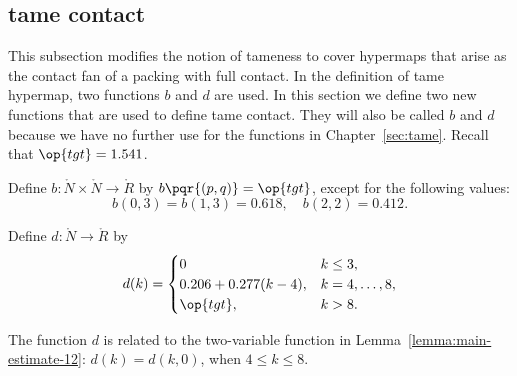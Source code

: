 \subsection{tame contact}

This subsection modifies the notion of tameness to cover hypermaps
that arise as the contact fan of a packing with full contact.  In the
definition of tame hypermap, two functions $b$ and $d$ are used.  In
this section we define two new functions that are used to define tame
contact.  They will also be called $b$ and $d$ because we have no
further use for the functions in Chapter~\ref{sec:tame}.  
Recall that $\op{tgt}=1.541$.
%
%

\begin{definition}[b]
  Define $b:\ring{N}\times \ring{N}\to \ring{R}$ by
  $b\pqr{(p,q)}=\op{tgt}$, except for the following values:
\begin{displaymath}
b(0,3)=b(1,3)=0.618,\quad b(2,2)=0.412.
\end{displaymath}
\end{definition}
%

\begin{definition}[d]
Define $d:\ring{N}\to \ring{R}$ by
\begin{displaymath}d(k) = \begin{cases}
0 & k\le 3, \\
0.206 + 0.277 (k-4),& k=4,\ldots,8,\\
\op{tgt},& k>8.\\
\end{cases}
\end{displaymath}
\end{definition}
%

The function $d$ is related to the two-variable function in Lemma~\ref{lemma:main-estimate-12}: $d(k) = d(k,0)$, when $4\le k\le 8$.

